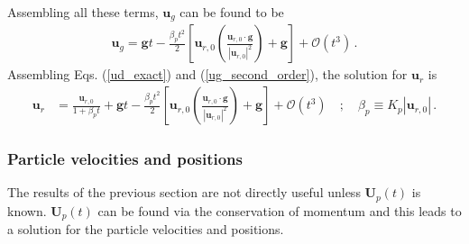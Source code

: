 Assembling all these terms, $\mathbf{u}_g$ can be found to be
\begin{align}
    \label{ug_second_order}
    \mathbf{u}_g = \mathbf{g} t - \frac{\beta_p t^2}{2} \left[\mathbf{u}_{r,0} \left(\frac{\mathbf{u}_{r,0} \cdot \mathbf{g}}{|\mathbf{u}_{r,0}|^2}\right) + \mathbf{g}\right] + \mathcal{O}(t^3) \,.
\end{align}
Assembling Eqs. (\ref{ud_exact}) and (\ref{ug_second_order}), the solution for $\mathbf{u}_r$ is
\begin{align}
    \label{ur_short}
    \mathbf{u}_r &= \frac{\mathbf{u}_{r,0}}{1 + \beta_p t} + \mathbf{g} t - \frac{\beta_p t^2}{2} \left[\mathbf{u}_{r,0} \left(\frac{\mathbf{u}_{r,0} \cdot \mathbf{g}}{|\mathbf{u}_{r,0}|^2}\right) + \mathbf{g}\right] + \mathcal{O}(t^3) \quad ; \quad \beta_p \equiv K_p |\mathbf{u}_{r,0}| \,. %
\end{align}
\subsubsection{Particle velocities and positions}
The results of the previous section are not directly useful unless $\mathbf{U}_p(t)$ is known. $\mathbf{U}_p(t)$ can be found via the conservation of momentum and this leads to a solution for the particle velocities and positions.


